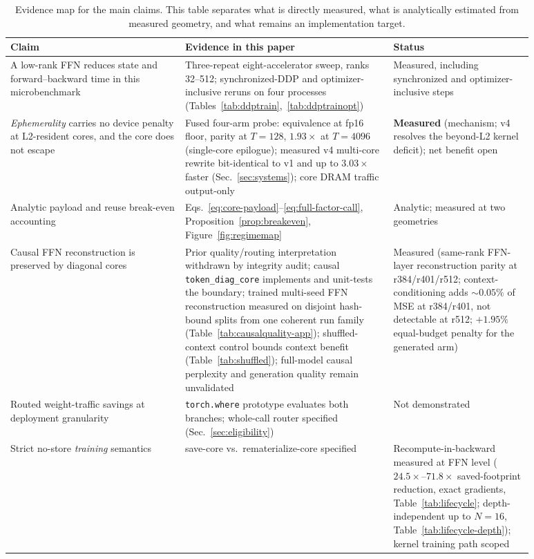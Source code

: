 \begin{table}[t]
\centering
\caption{Evidence map for the main claims. This table separates what is
directly measured, what is analytically estimated from measured geometry, and
what remains an implementation target.}
\label{tab:evidencemap}
\small
\begin{tabular}{>{\raggedright\arraybackslash}p{0.30\linewidth}>{\raggedright\arraybackslash}p{0.34\linewidth}>{\raggedright\arraybackslash}p{0.24\linewidth}}
\toprule
Claim & Evidence in this paper & Status \\
\midrule
A low-rank FFN reduces state and forward--backward time in this microbenchmark &
Three-repeat eight-accelerator sweep, ranks 32--512; synchronized-DDP and optimizer-inclusive reruns on four processes (Tables~\ref{tab:ddptrain},~\ref{tab:ddptrainopt}) &
Measured, including synchronized and optimizer-inclusive steps \\
\emph{Ephemerality} carries no device penalty at L2-resident cores, and the core does not escape &
Fused four-arm probe: equivalence at fp16 floor, parity at $T{=}128$, $1.93\times$ at $T{=}4096$ (single-core epilogue); measured v4 multi-core rewrite bit-identical to v1 and up to $3.03\times$ faster (Sec.~\ref{sec:systems}); core DRAM traffic output-only &
\textbf{Measured} (mechanism; v4 resolves the beyond-L2 kernel deficit); net benefit open \\
Analytic payload and reuse break-even accounting &
Eqs.~\eqref{eq:core-payload}--\eqref{eq:full-factor-call}, Proposition~\ref{prop:breakeven}, Figure~\ref{fig:regimemap} &
Analytic; measured at two geometries \\
Causal FFN reconstruction is preserved by diagonal cores &
Prior quality/routing interpretation withdrawn by integrity audit; causal \texttt{token\_diag\_core} implements and unit-tests the boundary; trained multi-seed FFN reconstruction measured on disjoint hash-bound splits from one coherent run family (Table~\ref{tab:causalquality-app}); shuffled-context control bounds context benefit (Table~\ref{tab:shuffled}); full-model causal perplexity and generation quality remain unvalidated &
Measured (same-rank FFN-layer reconstruction parity at r384/r401/r512; context-conditioning adds ${\sim}0.05\%$ of MSE at r384/r401, not detectable at r512; $+1.95\%$ equal-budget penalty for the generated arm) \\
Routed weight-traffic savings at deployment granularity &
\texttt{torch.where} prototype evaluates both branches; whole-call router specified (Sec.~\ref{sec:eligibility}) &
Not demonstrated \\
Strict no-store \emph{training} semantics &
save-core vs.\ rematerialize-core specified &
Recompute-in-backward measured at FFN level ($24.5\times$--$71.8\times$ saved-footprint reduction, exact gradients, Table~\ref{tab:lifecycle}; depth-independent up to $N{=}16$, Table~\ref{tab:lifecycle-depth}); kernel training path scoped \\
\bottomrule
\end{tabular}
\end{table}

